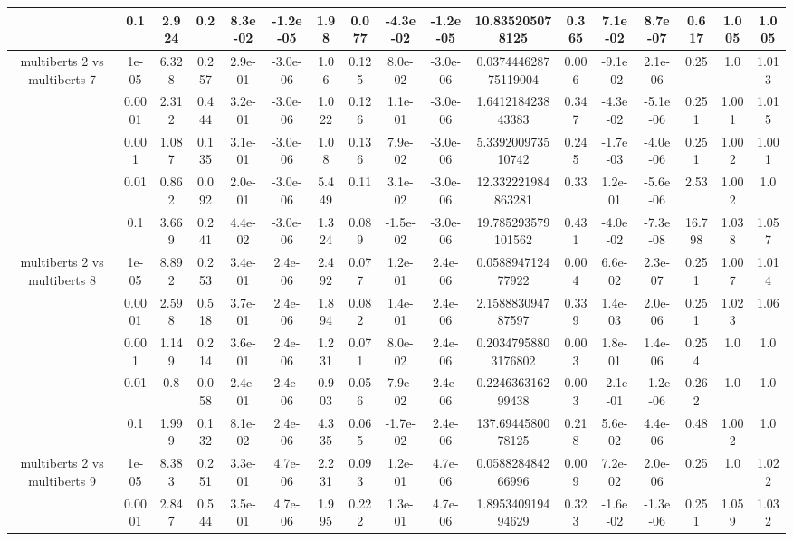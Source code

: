 \begin{tabular}{|c|c|c|c|c|c|c|c|c|c|c|c|c|c|c|c|c|}
 & 0.1 & 2.924 & 0.2 & 8.3e-02 & -1.2e-05 & 1.98 & 0.077 & -4.3e-02 & -1.2e-05 & 10.835205078125 & 0.365 & 7.1e-02 & 8.7e-07 & 0.617 & 1.005 & 1.005 \\
\hline
\multirow{5}{*}{multiberts 2 vs multiberts 7} & 1e-05 & 6.328 & 0.257 & 2.9e-01 & -3.0e-06 & 1.06 & 0.125 & 8.0e-02 & -3.0e-06 & 0.037444628775119004 & 0.006 & -9.1e-02 & 2.1e-06 & 0.25 & 1.0 & 1.013 \\
 & 0.0001 & 2.312 & 0.444 & 3.2e-01 & -3.0e-06 & 1.022 & 0.126 & 1.1e-01 & -3.0e-06 & 1.641218423843383 & 0.347 & -4.3e-02 & -5.1e-06 & 0.251 & 1.001 & 1.015 \\
 & 0.001 & 1.087 & 0.135 & 3.1e-01 & -3.0e-06 & 1.08 & 0.136 & 7.9e-02 & -3.0e-06 & 5.339200973510742 & 0.245 & -1.7e-03 & -4.0e-06 & 0.251 & 1.002 & 1.001 \\
 & 0.01 & 0.862 & 0.092 & 2.0e-01 & -3.0e-06 & 5.449 & 0.11 & 3.1e-02 & -3.0e-06 & 12.332221984863281 & 0.33 & 1.2e-01 & -5.6e-06 & 2.53 & 1.002 & 1.0 \\
 & 0.1 & 3.669 & 0.241 & 4.4e-02 & -3.0e-06 & 1.324 & 0.089 & -1.5e-02 & -3.0e-06 & 19.785293579101562 & 0.431 & -4.0e-02 & -7.3e-08 & 16.798 & 1.038 & 1.057 \\
\hline
\multirow{5}{*}{multiberts 2 vs multiberts 8} & 1e-05 & 8.892 & 0.253 & 3.4e-01 & 2.4e-06 & 2.492 & 0.077 & 1.2e-01 & 2.4e-06 & 0.058894712477922 & 0.004 & 6.6e-02 & 2.3e-07 & 0.251 & 1.007 & 1.014 \\
 & 0.0001 & 2.598 & 0.518 & 3.7e-01 & 2.4e-06 & 1.894 & 0.082 & 1.4e-01 & 2.4e-06 & 2.158883094787597 & 0.339 & 1.4e-03 & 2.0e-06 & 0.251 & 1.023 & 1.06 \\
 & 0.001 & 1.149 & 0.214 & 3.6e-01 & 2.4e-06 & 1.231 & 0.071 & 8.0e-02 & 2.4e-06 & 0.20347958803176802 & 0.003 & 1.8e-01 & 1.4e-06 & 0.254 & 1.0 & 1.0 \\
 & 0.01 & 0.8 & 0.058 & 2.4e-01 & 2.4e-06 & 0.903 & 0.056 & 7.9e-02 & 2.4e-06 & 0.224636316299438 & 0.003 & -2.1e-01 & -1.2e-06 & 0.262 & 1.0 & 1.0 \\
 & 0.1 & 1.999 & 0.132 & 8.1e-02 & 2.4e-06 & 4.335 & 0.065 & -1.7e-02 & 2.4e-06 & 137.6944580078125 & 0.218 & 5.6e-02 & 4.4e-06 & 0.48 & 1.002 & 1.0 \\
\hline
\multirow{5}{*}{multiberts 2 vs multiberts 9} & 1e-05 & 8.383 & 0.251 & 3.3e-01 & 4.7e-06 & 2.231 & 0.093 & 1.2e-01 & 4.7e-06 & 0.058828484266996 & 0.009 & 7.2e-02 & 2.0e-06 & 0.25 & 1.0 & 1.022 \\
 & 0.0001 & 2.847 & 0.544 & 3.5e-01 & 4.7e-06 & 1.995 & 0.222 & 1.3e-01 & 4.7e-06 & 1.895340919494629 & 0.323 & -1.6e-02 & -1.3e-06 & 0.251 & 1.059 & 1.032 \\

\end{tabular}
